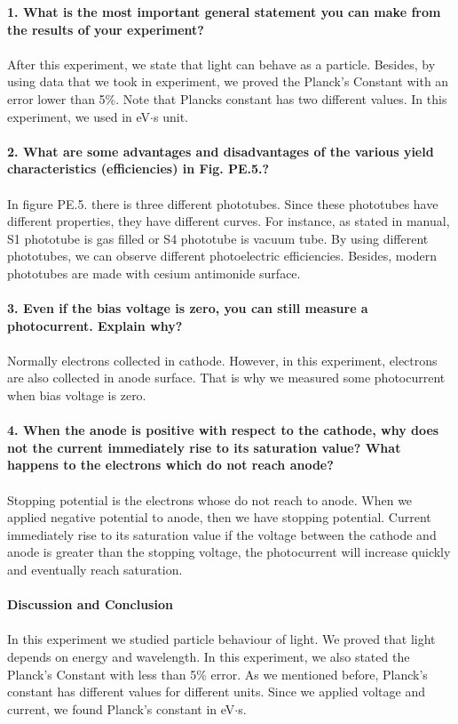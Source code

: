 \documentclass[a4paper,12pt]{article}
\begin{document}
\textbf{1. What is the most important general statement you can make from the results of your experiment?}\\\\
After this experiment, we state that light can behave as a particle. Besides, by using data that we took in experiment, we proved the Planck's Constant with an error lower than 5\%. Note that Plancks constant has two different values. In this experiment, we used in eV$\cdot$s unit.\\\\
\textbf{2. What are some advantages and disadvantages of the various yield characteristics (efficiencies) in Fig. PE.5.?}\\\\
In figure PE.5. there is three different phototubes. Since these phototubes have different properties, they have different curves. For instance, as stated in manual, S1 phototube is gas filled or S4 phototube is vacuum tube. By using different phototubes, we can observe different photoelectric efficiencies. Besides, modern phototubes are made with cesium antimonide surface.\\\\
\newpage
\textbf{3. Even if the bias voltage is zero, you can still measure a photocurrent. Explain why?}\\\\
Normally electrons collected in cathode. However, in this experiment, electrons are also collected in anode surface. That is why we measured some photocurrent when bias voltage is zero.\\\\
\textbf{4. When the anode is positive with respect to the cathode, why does not the current immediately rise to its saturation value? What happens to the electrons which do not reach anode?}\\\\
Stopping potential is the electrons whose do not reach to anode. When we applied negative potential to anode, then we have stopping potential. Current immediately rise to its saturation value if the voltage between the cathode and anode is greater than the stopping voltage, the photocurrent will increase quickly and eventually reach saturation.\\\\
\textbf{Discussion and Conclusion}\\\\
In this experiment we studied particle behaviour of light. We proved that light depends on energy and wavelength. In this experiment, we also stated the Planck's Constant with less than 5\% error. As we mentioned before, Planck's constant has different values for different units. Since we applied voltage and current, we found Planck's constant in eV$\cdot$s. 
\end{document}
